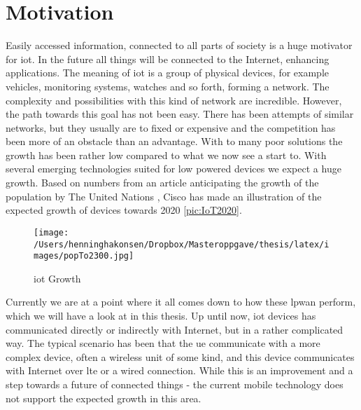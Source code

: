 \documentclass[USenglish]{ifimaster}  %
\begin{document}
\section{Motivation}
Easily accessed information, connected to all parts of society is a huge motivator for \acrfull{iot}. In the future all things will be connected to the Internet, enhancing applications. The meaning of \acrshort{iot} is a group of physical devices, for example vehicles, monitoring systems, watches and so forth, forming a network. The complexity and possibilities with this kind of network are incredible. However, the path towards this goal has not been easy. There has been attempts of similar networks, but they usually are to fixed or expensive and the competition has been more of an obstacle than an advantage. With to many poor solutions the growth has been rather low compared to what we now see a start to. With several emerging technologies suited for low powered devices we expect a huge growth. Based on numbers from an article anticipating the growth of the population by The United Nations \cite{online:pop2300}, Cisco has made an illustration of the expected growth of devices towards 2020 \vref{pic:IoT2020}.

\begin{figure}[ht]
  \centering\texttt{[image: /Users/henninghakonsen/Dropbox/Masteroppgave/thesis/latex/images/popTo2300.jpg]}
  \caption{\acrshort{iot} Growth \cite{online:IoT2020}}
  \label{pic:IoT2020}
\end{figure}

Currently we are at a point where it all comes down to how these \acrshort{lpwan} perform, which we will have a look at in this thesis. Up until now, \acrshort{iot} devices has communicated directly or indirectly with Internet, but in a rather complicated way. The typical scenario has been that the \acrfull{ue} communicate with a more complex device, often a wireless unit of some kind, and this device communicates with Internet over \acrshort{lte} or a wired connection. While this is an improvement and a step towards a future of connected things - the current mobile technology does not support the expected growth in this area.
\end{document}
